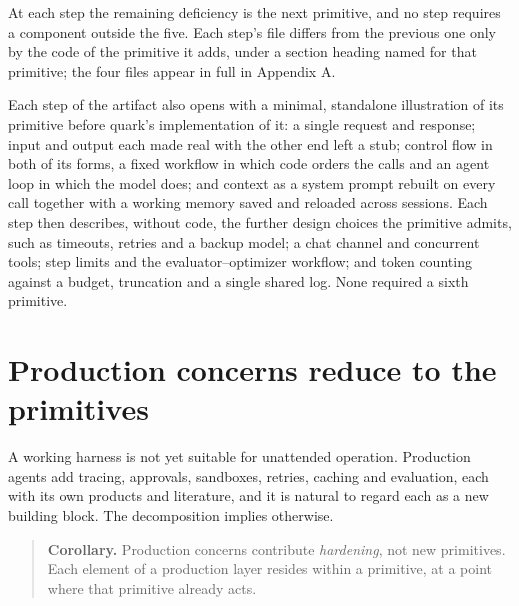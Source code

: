 At each step the remaining deficiency is the next primitive, and no step requires a component outside the five. Each step's file differs from the previous one only by the code of the primitive it adds, under a section heading named for that primitive; the four files appear in full in Appendix A.

Each step of the artifact also opens with a minimal, standalone illustration of its primitive before quark's implementation of it: a single request and response; input and output each made real with the other end left a stub; control flow in both of its forms, a fixed workflow in which code orders the calls and an agent loop in which the model does; and context as a system prompt rebuilt on every call together with a working memory saved and reloaded across sessions. Each step then describes, without code, the further design choices the primitive admits, such as timeouts, retries and a backup model; a chat channel and concurrent tools; step limits and the evaluator--optimizer workflow; and token counting against a budget, truncation and a single shared log. None required a sixth primitive.

\section{Production concerns reduce to the primitives}

A working harness is not yet suitable for unattended operation. Production agents add tracing, approvals, sandboxes, retries, caching and evaluation, each with its own products and literature, and it is natural to regard each as a new building block. The decomposition implies otherwise.

\begin{quote}
\textbf{Corollary.} Production concerns contribute \emph{hardening}, not new primitives. Each element of a production layer resides within a primitive, at a point where that primitive already acts.
\end{quote}

